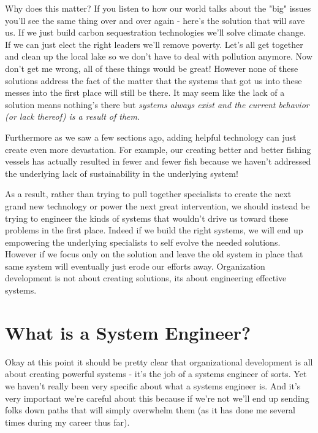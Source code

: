\documentclass[11pt,a5paper]{book}
\begin{document}
Why does this matter? If you listen to how our world talks about the "big" issues you'll see the same thing over and over again - here's the solution that will save us. If we just build carbon sequestration technologies we'll solve climate change. If we can just elect the right leaders we'll remove poverty. Let's all get together and clean up the local lake so we don't have to deal with pollution anymore. Now don't get me wrong, all of these things would be great! However none of these solutions address the fact of the matter that the systems that got us into these messes into the first place will still be there. It may seem like the lack of a solution means nothing's there but \textit{systems always exist and the current behavior (or lack thereof) is a result of them}.
\newline

Furthermore as we saw a few sections ago, adding helpful technology can just create even more devastation. For example, our creating better and better fishing vessels has actually resulted in fewer and fewer fish \cite{meadows} because we haven't addressed the underlying lack of sustainability in the underlying system!
\newline

As a result, rather than trying to pull together specialists to create the next grand new technology or power the next great intervention, we should instead be trying to engineer the kinds of systems that wouldn't drive us toward these problems in the first place. Indeed if we build the right systems, we will end up empowering the underlying specialists to self evolve the needed solutions. However if we focus only on the solution and leave the old system in place that same system will eventually just erode our efforts away. Organization development is not about creating solutions, its about engineering effective systems.

\section{What is a System Engineer?}
Okay at this point it should be pretty clear that organizational development is all about creating powerful systems - it's the job of a systems engineer of sorts. Yet we haven't really been very specific about what a systems engineer is. And it's very important we're careful about this because if we're not we'll end up sending folks down paths that will simply overwhelm them (as it has done me several times during my career thus far). 
\newline
\end{document}
